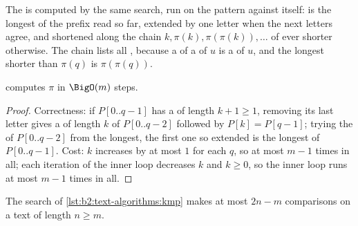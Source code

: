 \label{lst:b2:text-algorithms:kmp}

\label{out:b2:text-algorithms:kmp}

The  is computed by the same search, run on the pattern against itself:  is the longest 
of the prefix read so far, extended by one letter when the next letters agree, and shortened along the chain $k, \pi(k),
\pi(\pi(k)), \dots$ of ever shorter  otherwise. The chain lists all , because a  of a  of $u$
is a  of $u$, and the longest  shorter than $\pi(q)$ is $\pi(\pi(q))$.

\begin{proposition}\label{prop:b2:text-algorithms:failure}
 computes $\pi$ in $\BigO(m)$ steps.
\end{proposition}

\begin{proof}
Correctness: if $P[0..q-1]$ has a  of length $k + 1 \geq 1$, removing its last letter gives a  of length $k$
of $P[0..q-2]$ followed by $P[k] = P[q - 1]$; trying the  of $P[0..q-2]$ from the longest, the first one so
extended is the longest  of $P[0..q-1]$. Cost: $k$ increases by at most $1$ for each $q$, so at most $m - 1$
times in all; each iteration of the inner loop decreases $k$ and $k \geq 0$, so the inner loop runs at most $m - 1$
times in all.
\end{proof}

\begin{theorem}\label{thm:b2:text-algorithms:kmp-linear}
The search of \cref{lst:b2:text-algorithms:kmp} makes at most $2n - m$ comparisons on a text of length $n \geq m$.
\end{theorem}

